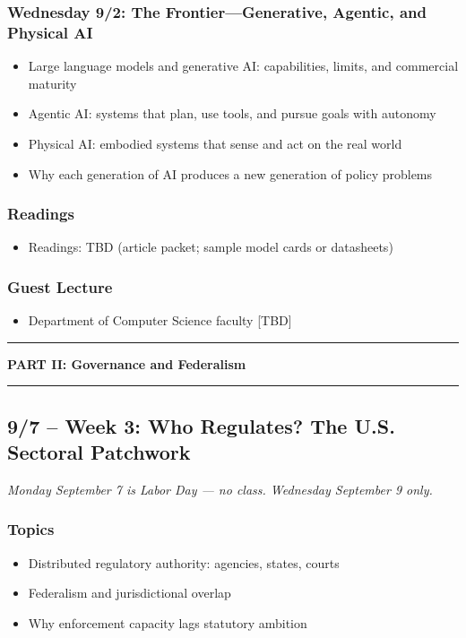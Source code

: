 \documentclass[12pt]{article}
\begin{document}
    \subsubsection*{Wednesday 9/2: The Frontier---Generative, Agentic, and Physical AI}
        \begin{itemize}
            \item Large language models and generative AI: capabilities, limits, and commercial maturity
            \item Agentic AI: systems that plan, use tools, and pursue goals with autonomy
            \item Physical AI: embodied systems that sense and act on the real world
            \item Why each generation of AI produces a new generation of policy problems
        \end{itemize}
    \subsubsection*{Readings}
        \begin{itemize}
            \item Readings: TBD (article packet; sample model cards or datasheets)
        \end{itemize}
    \subsubsection*{Guest Lecture}
        \begin{itemize}
            \item Department of Computer Science faculty [TBD]
        \end{itemize}

\bigskip
\noindent\rule{\textwidth}{0.6pt}
\begin{center}\textbf{PART II: Governance and Federalism}\end{center}
\noindent\rule{\textwidth}{0.6pt}

\subsection*{9/7 -- Week 3: Who Regulates? The U.S. Sectoral Patchwork}
\emph{Monday September 7 is Labor Day --- no class. Wednesday September 9 only.}
    \subsubsection*{Topics}
        \begin{itemize}
            \item Distributed regulatory authority: agencies, states, courts
            \item Federalism and jurisdictional overlap
            \item Why enforcement capacity lags statutory ambition
        \end{itemize}
\end{document}
